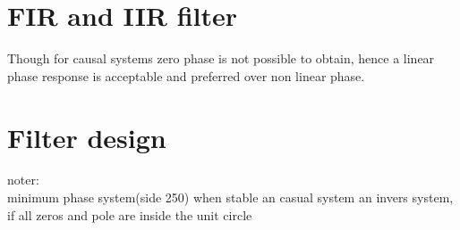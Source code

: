 \section{FIR and IIR filter }

Though for causal systems zero phase is not possible to obtain, hence a linear phase response is acceptable and preferred over non linear phase. 


\section{Filter design}

noter: \\
minimum phase system(side 250) when stable an casual system an invers system, if all zeros and pole are inside the unit circle 
